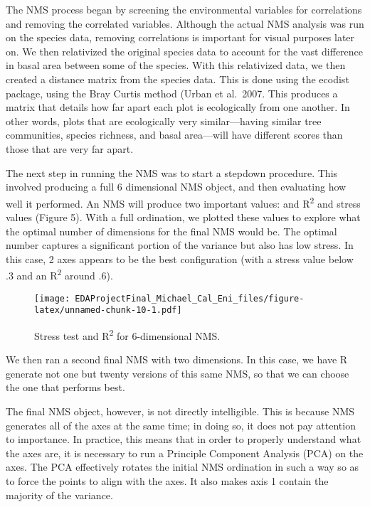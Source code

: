 \documentclass[
  12pt,
]{article}
\begin{document}
The NMS process began by screening the environmental variables for
correlations and removing the correlated variables. Although the actual
NMS analysis was run on the species data, removing correlations is
important for visual purposes later on. We then relativized the original
species data to account for the vast difference in basal area between
some of the species. With this relativized data, we then created a
distance matrix from the species data. This is done using the ecodist
package, using the Bray Curtis method (Urban et al.~2007. This produces
a matrix that details how far apart each plot is ecologically from one
another. In other words, plots that are ecologically very
similar---having similar tree communities, species richness, and basal
area---will have different scores than those that are very far apart.

The next step in running the NMS was to start a stepdown procedure. This
involved producing a full 6 dimensional NMS object, and then evaluating
how well it performed. An NMS will produce two important values: and
R\textsuperscript{2} and stress values (Figure 5). With a full
ordination, we plotted these values to explore what the optimal number
of dimensions for the final NMS would be. The optimal number captures a
significant portion of the variance but also has low stress. In this
case, 2 axes appears to be the best configuration (with a stress value
below .3 and an R\textsuperscript{2} around .6).

\begin{figure}
\centering
\texttt{[image: EDAProjectFinal\_Michael\_Cal\_Eni\_files/figure-latex/unnamed-chunk-10-1.pdf]}
\caption{Stress test and R\textsuperscript{2} for 6-dimensional NMS.}
\end{figure}

We then ran a second final NMS with two dimensions. In this case, we
have R generate not one but twenty versions of this same NMS, so that we
can choose the one that performs best.

The final NMS object, however, is not directly intelligible. This is
because NMS generates all of the axes at the same time; in doing so, it
does not pay attention to importance. In practice, this means that in
order to properly understand what the axes are, it is necessary to run a
Principle Component Analysis (PCA) on the axes. The PCA effectively
rotates the initial NMS ordination in such a way so as to force the
points to align with the axes. It also makes axis 1 contain the majority
of the variance.
\end{document}
